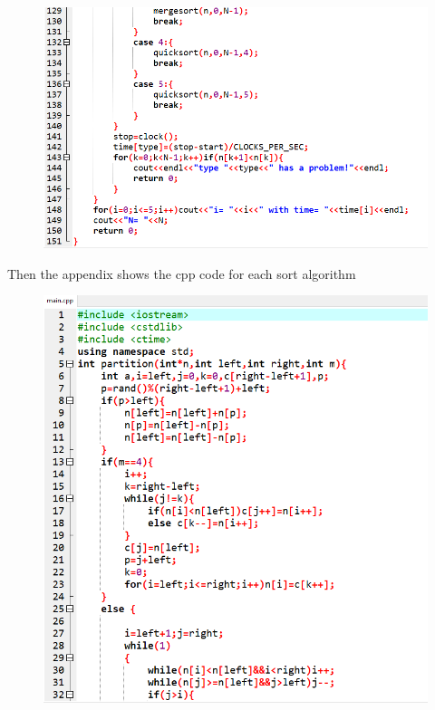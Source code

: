 \documentclass[12pt]{article}
\begin{document}
\begin{figure}[H]
\centering
\includegraphics[scale=0.6]{P7.png}
\end{figure}
Then the appendix shows the cpp code for each sort algorithm
\begin{figure}[H]
\centering
\includegraphics[scale=0.6]{P8.png}
\end{figure}
\end{document}
